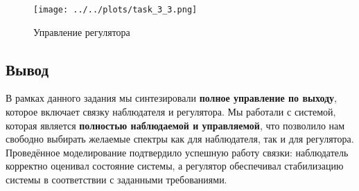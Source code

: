 \begin{figure}[H]
    \centering
    \texttt{[image: ../../plots/task\_3\_3.png]}
    \caption{Управление регулятора}
    \label{fig:task_3_control_signal}
\end{figure}


\subsection{Вывод}
В рамках данного задания мы синтезировали \textbf{полное управление по выходу}, которое включает связку наблюдателя и регулятора. Мы работали с системой, которая является \textbf{полностью наблюдаемой и управляемой}, что позволило нам свободно выбирать желаемые спектры как для наблюдателя, так и для регулятора. Проведённое моделирование подтвердило успешную работу связки: наблюдатель корректно оценивал состояние системы, а регулятор обеспечивал стабилизацию системы в соответствии с заданными требованиями.